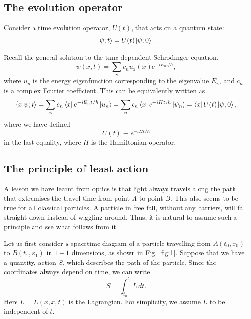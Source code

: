 \documentclass[12pt,a4paper]{article}
\begin{document}
\subsection{The evolution operator}
\label{sec:HS}
Consider a time evolution operator, $U(t)$, that acts on a quantum state:
\begin{equation}
    \ket{\psi;t} = U(t)\ket{\psi;0}.
\end{equation}

Recall the general solution to the time-dependent Schrödinger equation,
\begin{equation}
    \psi(x,t) = \sum_nc_nu_n(x)e^{-iE_nt/\hbar},
\end{equation}
where $u_n$ is the energy eigenfunction corresponding to the eigenvalue $E_n$, and $c_n$ is a complex Fourier coefficient. This can be equivalently written as
\begin{equation}
    \braket{x}{\psi;t} = \sum_n c_n\bra{x}e^{-iE_nt/\hbar}\ket{u_n} = \sum_nc_n\bra{x}e^{-iHt/\hbar}\ket{\psi_n} = \bra{x}U(t)\ket{\psi;0},
\end{equation}
where we have defined
\begin{equation}
    U(t) \equiv e^{-iHt/\hbar}
\end{equation}
in the last equality, where $H$ is the Hamiltonian operator.

\subsection{The principle of least action}
\label{sec:LC}
A lesson we have learnt from optics is that light always travels along the path that extremises the travel time from point $A$ to point $B$.
This also seems to be true for all classical particles. A particle in free fall, without any barriers, will fall straight down instead of wiggling around. Thus, it is natural to assume such a principle and see what follows from it.

Let us first consider a spacetime diagram of a particle travelling from $A(t_0,x_0)$ to $B(t_1,x_1)$ in $1+1$ dimensions, as shown in Fig. \ref{fig:1}. Suppose that we have a quantity, action $S$, which describes the path of the particle. Since the coordinates always depend on time, we can write
\begin{equation}
    S = \int_{t_0}^{t_1} L\, dt.
\end{equation}
Here $L=L(x,\dot{x},t)$ is the Lagrangian. For simplicity, we assume $L$ to be independent of $t$.
\end{document}
